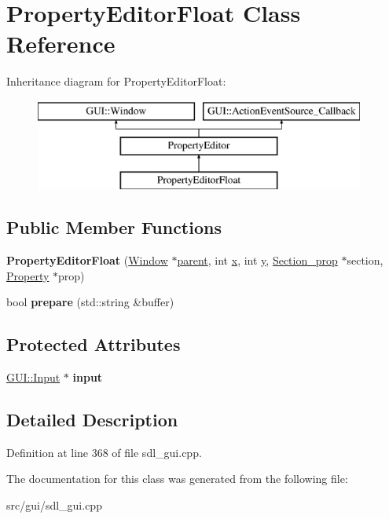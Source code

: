 \hypertarget{classPropertyEditorFloat}{\section{Property\-Editor\-Float Class Reference}
\label{classPropertyEditorFloat}
}
Inheritance diagram for Property\-Editor\-Float\-:\begin{figure}[H]
\begin{center}
\leavevmode
\includegraphics[height=3.000000cm]{classPropertyEditorFloat}
\end{center}
\end{figure}
\subsection*{Public Member Functions}
\begin{DoxyCompactItemize}
\item 
\hypertarget{classPropertyEditorFloat_a802ab5b49e83b39a3bafd825f7423f6f}{{\bfseries Property\-Editor\-Float} (\hyperlink{classGUI_1_1Window_ae828e9daa964dfc65a3550fb03117d30}{Window} $\ast$\hyperlink{classGUI_1_1Window_a2e593ff65e7702178d82fe9010a0b539}{parent}, int \hyperlink{classGUI_1_1Window_a6ca6a80ca00c9e1d8ceea8d3d99a657d}{x}, int \hyperlink{classGUI_1_1Window_a0ee8e923aff2c3661fc2e17656d37adf}{y}, \hyperlink{classSection__prop}{Section\-\_\-prop} $\ast$section, \hyperlink{classProperty}{Property} $\ast$prop)}\label{classPropertyEditorFloat_a802ab5b49e83b39a3bafd825f7423f6f}

\item 
\hypertarget{classPropertyEditorFloat_adbc9db52bdfd97df5ec2f62d3a59db87}{bool {\bfseries prepare} (std\-::string \&buffer)}\label{classPropertyEditorFloat_adbc9db52bdfd97df5ec2f62d3a59db87}

\end{DoxyCompactItemize}
\subsection*{Protected Attributes}
\begin{DoxyCompactItemize}
\item 
\hypertarget{classPropertyEditorFloat_a84a33b96ef3bd08106b7ab4aa8ef7039}{\hyperlink{classGUI_1_1Input}{G\-U\-I\-::\-Input} $\ast$ {\bfseries input}}\label{classPropertyEditorFloat_a84a33b96ef3bd08106b7ab4aa8ef7039}

\end{DoxyCompactItemize}


\subsection{Detailed Description}


Definition at line 368 of file sdl\-\_\-gui.\-cpp.



The documentation for this class was generated from the following file\-:\begin{DoxyCompactItemize}
\item 
src/gui/sdl\-\_\-gui.\-cpp\end{DoxyCompactItemize}
